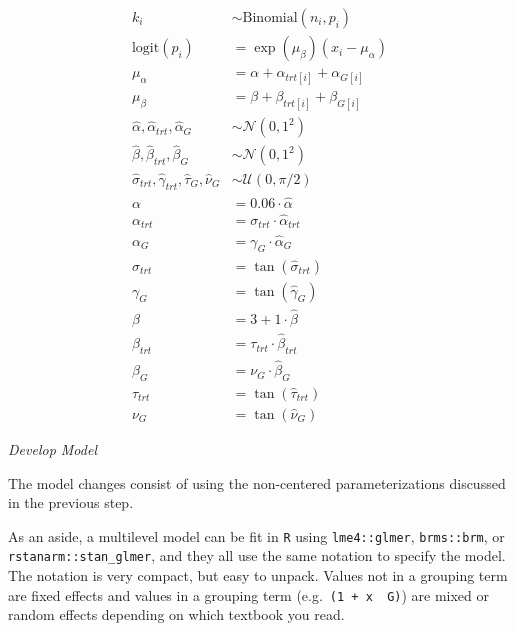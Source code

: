 \documentclass[11pt, oneside, openany]{scrbook}
\begin{document}
\begin{equation}
\begin{split}
k_i &\sim \mathrm{Binomial}(n_i, p_i) \\
\mathrm{logit}(p_i) &= \exp(\mu_\beta) (x_i - \mu_\alpha) \\
\mu_\alpha &= \alpha + \alpha_{trt[i]} + \alpha_{G[i]} \\
\mu_\beta &= \beta + \beta_{trt[i]} + \beta_{G[i]} \\
\hat{\alpha}, \hat{\alpha}_{trt}, \hat{\alpha}_{G} &\sim \mathcal{N}(0, 1^2) \\
\hat{\beta}, \hat{\beta}_{trt}, \hat{\beta}_{G} &\sim \mathcal{N}(0, 1^2) \\
\hat{\sigma}_{trt}, \hat{\gamma}_{trt}, \hat{\tau}_{G}, \hat{\nu}_{G} &\sim \mathcal{U}(0, \pi/2) \\
\alpha &= 0.06 \cdot \hat{\alpha} \\
\alpha_{trt} &= \sigma_{trt} \cdot \hat{\alpha}_{trt} \\
\alpha_{G} &= \gamma_{G} \cdot \hat{\alpha}_{G} \\
\sigma_{trt} &= \tan(\hat{\sigma}_{trt}) \\
\gamma_{G} &= \tan(\hat{\gamma}_{G}) \\
\beta &= 3 + 1 \cdot \hat{\beta} \\
\beta_{trt} &= \tau_{trt} \cdot \hat{\beta}_{trt} \\
\beta_{G} &= \nu_{G} \cdot \hat{\beta}_{G} \\
\tau_{trt} &= \tan(\hat{\tau}_{trt}) \\
\nu_{G} &= \tan(\hat{\nu}_{G})
\end{split}
\label{eq:iter2-model-nc}
\end{equation}

\emph{Develop Model}

The model changes consist of using the non-centered parameterizations discussed in the previous step.

As an aside, a multilevel model can be fit in \texttt{R} using \texttt{lme4::glmer}, \texttt{brms::brm}, or \texttt{rstanarm::stan\_glmer}, and they all use the same notation to specify the model. The notation is very compact, but easy to unpack. Values not in a grouping term are fixed effects and values in a grouping term (e.g.~\texttt{(1\ +\ x\ \textbar{}\ G)}) are mixed or random effects depending on which textbook you read.

\end{document}
